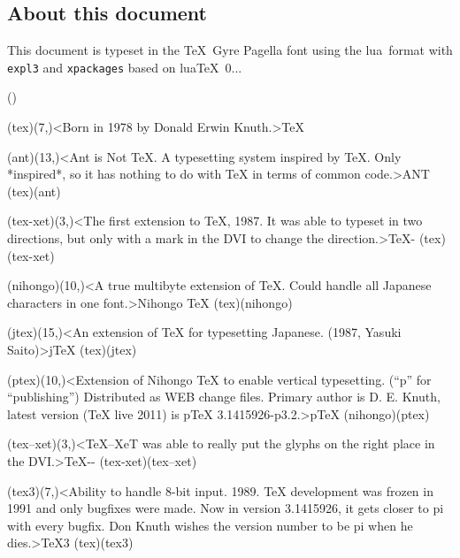 \subsection*{About this document}
This document is typeset in the \TeX\ Gyre Pagella font using the lua\LaTeXe\ format with \verb|expl3| and \verb|xpackages| based on lua\TeX\ 0.\the\luatexversion.\luatexrevision.



\label{sec:tree}
\Large
\centering

\label{textextview}
\tograph*({}){
	\tonode[\vip](tex)(7,\layer)<Born in 1978 by Donald Erwin Knuth.>{\TeX}
	
	\tonode[\program](ant)(13,\layer)<Ant is Not TeX. A typesetting system inspired by TeX. Only *inspired*, so it has nothing to do with TeX in terms of common code.>{ANT}
	\todraw[dotted](tex)(ant)
	
	\steplayer[-1.5]
	\tonode(tex-xet)(3,\layer)<The first extension to TeX, 1987. It was able to typeset in two directions, but only with a mark in the DVI to change the direction.>{\TeX-\XeT}
	\todraw(tex)(tex-xet)

	\tonode(nihongo)(10,\layer)<A true multibyte extension of TeX. Could handle all Japanese characters in one font.>{Nihongo \TeX}
	\todraw(tex)(nihongo)
	
	\tonode(jtex)(15,\layer)<An extension of TeX for typesetting Japanese. (1987, Yasuki Saito)>{j\TeX}
	\todraw(tex)(jtex)

	\steplayer[-1.5]
	\tonode(ptex)(10,\layer)<Extension of Nihongo TeX to enable vertical typesetting. (“p” for “publishing”)  Distributed as WEB change files. Primary author is D. E. Knuth, latest version (TeX live 2011) is pTeX 3.1415926-p3.2.>{p\TeX}
	\todraw(nihongo)(ptex)

	\steplayer[-1.5]
	\tonode(tex--xet)(3,\layer)<TeX--XeT was able to really put the glyphs on the right place in the DVI.>{\TeX-{}-\XeT}
	\todraw(tex-xet)(tex--xet)
	
	\tonode[\vip](tex3)(7,\layer)<Ability to handle 8-bit input. 1989. TeX development was frozen in 1991 and only bugfixes were made. Now in version 3.1415926, it gets closer to pi with every bugfix. Don Knuth wishes the version number to be pi when he dies.>{\TeX3}
	\todraw*(tex)(tex3)

}
